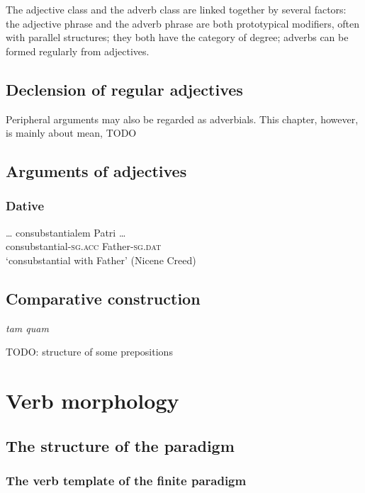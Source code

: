 \documentclass[a4paper, oneside, 12pt]{report}
\newcommand{\form}[1]{\emph{#1}}
\newcommand*{\category}[1]{\textsc{#1}}
\newcommand{\translate}[1]{`#1'}
\begin{document}
The adjective class and the adverb class are linked together by several factors:
the adjective phrase and the adverb phrase are both prototypical modifiers,
often with parallel structures;
they both have the category of degree; 
adverbs can be formed regularly from adjectives.

\section{Declension of regular adjectives}

Peripheral arguments may also be regarded as adverbials.
This chapter, however, is mainly about mean, TODO

\section{Arguments of adjectives}

\subsection{Dative}

\begin{exe}
    \ex \gll \dots {} consubstantialem Patri \dots \\
    {} consubstantial-\category{sg.acc} Father-\category{sg.dat} \\
    \glt \translate{consubstantial with Father} (Nicene Creed)
\end{exe}

\section{Comparative construction}

\form{tam quam}

TODO: structure of some prepositions


\chapter{Verb morphology}\label{chap:verb}

\section{The structure of the paradigm}

\subsection{The verb template of the finite paradigm}\label{sec:verb.finite.paradigm}
\end{document}
